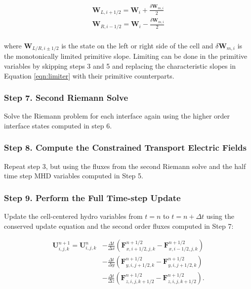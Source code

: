 \documentclass[modern]{aastex631}
\begin{document}
    \begin{equation}
        \begin{aligned}
            \boldsymbol{W}_{L, i+1/2} = \boldsymbol{W}_{i} + \frac{\delta \boldsymbol{W}_{m, i}}{2} \\
            \boldsymbol{W}_{R, i-1/2} = \boldsymbol{W}_{i} - \frac{\delta \boldsymbol{W}_{m, i}}{2} \\
        \end{aligned}
    \end{equation}

    \noindent where $ \boldsymbol{W}_{L/R, i\pm1/2} $ is the state on the left or right side
    of the cell and $ \delta \boldsymbol{W}_{m, i} $ is the monotonically limited
    primitive slope. Limiting can be done in the primitive variables by skipping steps 3 and 5 and replacing the characteristic slopes in Equation \ref{eqn:limiter} with their primitive counterparts.

\subsubsection{Step 7. Second Riemann Solve}
\label{vlct:2nd-riemann-solve}

Solve the Riemann problem for each interface again using the higher order interface states computed in step 6.

\subsubsection{Step 8. Compute the Constrained Transport Electric Fields}
\label{vlct:2nd-emf}

Repeat step 3, but using the fluxes from the second Riemann solve and the half time step MHD variables computed in Step 5.

\subsubsection{Step 9. Perform the Full Time-step Update}
\label{vlct:full-dt-update}

Update the cell-centered hydro variables from $t = n$ to $t = n + \Delta t$ using the conserved update equation and the second order fluxes computed in Step 7:

\begin{equation}
    \begin{aligned}
        \boldsymbol{U}^{n+1}_{i,j,k} = \boldsymbol{U}^{n}_{i,j,k}
        &- \frac{\Delta t}{\Delta x} \left( \boldsymbol{F}^{n+1/2}_{x,i+1/2,j,k} - \boldsymbol{F}^{n+1/2}_{x,i-1/2,j,k} \right) \\
        &- \frac{\Delta t}{\Delta y} \left( \boldsymbol{F}^{n+1/2}_{y,i,j+1/2,k} - \boldsymbol{F}^{n+1/2}_{y,i,j+1/2,k} \right) \\
        &- \frac{\Delta t}{\Delta z} \left( \boldsymbol{F}^{n+1/2}_{z,i,j,k+1/2} - \boldsymbol{F}^{n+1/2}_{z,i,j,k+1/2} \right).
    \end{aligned}
\end{equation}
\end{document}
